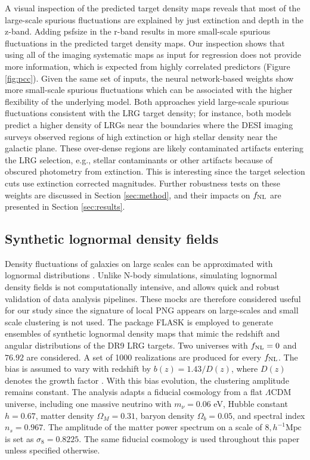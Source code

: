 A visual inspection of the predicted target density maps reveals that most of the large-scale spurious fluctuations are explained by just extinction and depth in the z-band. Adding psfsize in the r-band results in more small-scale spurious fluctuations in the predicted target density maps. Our inspection shows that using all of the imaging systematic maps as input for regression does not provide more information, which is expected from highly correlated predictors (Figure \ref{fig:pcc}). Given the same set of inputs, the neural network-based weights show more small-scale spurious fluctuations which can be associated with the higher flexibility of the underlying model. Both approaches yield large-scale spurious fluctuations consistent with the LRG target density; for instance, both models predict a higher density of LRGs near the boundaries where the DESI imaging surveys observed regions of high extinction or high stellar density near the galactic plane. These over-dense regions are likely contaminated artifacts entering the LRG selection, e.g., stellar contaminants or other artifacts because of obscured photometry from extinction. This is interesting since the target selection cuts use extinction corrected magnitudes. Further robustness tests on these weights are discussed in Section \ref{sec:method}, and their impacts on $f_{\rm NL}$ are presented in Section \ref{sec:results}.


\subsection{Synthetic lognormal density fields}\label{ssec:mocks}
Density fluctuations of galaxies on large scales can be approximated with lognormal distributions \citep{coles1991}. Unlike N-body simulations, simulating lognormal density fields is not computationally intensive, and allows quick and robust validation of data analysis pipelines. These mocks are therefore considered useful for our study since the signature of local PNG appears on large-scales and small scale clustering is not used. The package \textsc{FLASK} \citep[Full-sky Lognormal Astro-fields Simulation Kit;][]{Xavier_2016} is employed to generate ensembles of synthetic lognormal density maps that mimic the redshift and angular distributions of the DR9 LRG targets. Two universes with $f_{\rm NL}=0$ and $76.92$ are considered. A set of 1000 realizations are produced for every $f_{\rm NL}$. The bias is assumed to vary with redshift by $b(z)=1.43/D(z)$, where $D(z)$ denotes the growth factor \citep[see, e.g.,][]{zhou2021clustering}. With this bias evolution, the clustering amplitude remains constant. The analysis adapts a fiducial cosmology from a flat $\Lambda$CDM universe, including one massive neutrino with $m_{\nu}=0.06$ eV, Hubble constant $h = 0.67$, matter density $\Omega_{M}=0.31$, baryon density $\Omega_{b}=0.05$, and spectral index $n_{s}=0.967$. The amplitude of the matter power spectrum on a scale of $8, h^{-1} \text{Mpc}$ is set as $\sigma_{8}=0.8225$. The same fiducial cosmology is used throughout this paper unless specified otherwise. 


